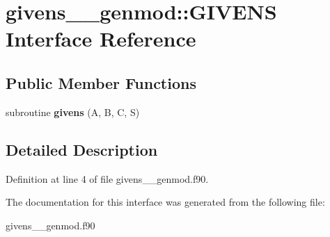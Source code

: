 \hypertarget{interfacegivens____genmod_1_1_g_i_v_e_n_s}{\section{givens\+\_\+\+\_\+genmod\+:\+:G\+I\+V\+E\+N\+S Interface Reference}
\label{interfacegivens____genmod_1_1_g_i_v_e_n_s}
}
\subsection*{Public Member Functions}
\begin{DoxyCompactItemize}
\item 
\hypertarget{interfacegivens____genmod_1_1_g_i_v_e_n_s_a211a6dc638d96d780112ffd52efeb121}{subroutine {\bfseries givens} (A, B, C, S)}\label{interfacegivens____genmod_1_1_g_i_v_e_n_s_a211a6dc638d96d780112ffd52efeb121}

\end{DoxyCompactItemize}


\subsection{Detailed Description}


Definition at line 4 of file givens\+\_\+\+\_\+genmod.\+f90.



The documentation for this interface was generated from the following file\+:\begin{DoxyCompactItemize}
\item 
givens\+\_\+\+\_\+genmod.\+f90\end{DoxyCompactItemize}
